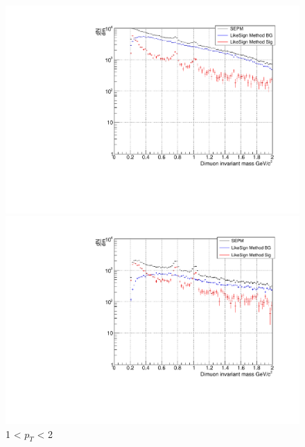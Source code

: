                 \begin{figure}[htbp]
                    \centering
                    \begin{minipage}{0.45\textwidth}
                        \centering
                        \includegraphics[width=\textwidth]{fig/3_4_1_CB_pt_1to2.pdf}
                        \captionsetup{labelformat=empty}
                        \caption{1 < $p_{T}$ < 2}
                        \label{Analysis:Dimuon:CB:CB_1to2}
                    \end{minipage}
                    \hfill
                    \begin{minipage}{0.45\textwidth}
                        \centering
                        \includegraphics[width=\textwidth]{fig/3_4_1_CB_pt_2to3.pdf}
                        \captionsetup{labelformat=empty}

\end{minipage}
\end{figure}
